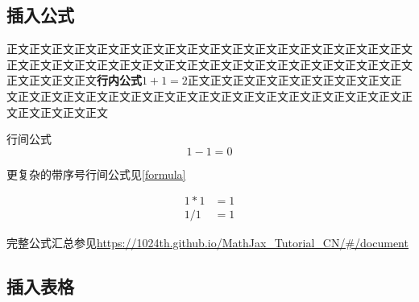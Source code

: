 \documentclass[a4paper]{article}
\begin{document}
\subsection{插入公式}
正文正文正文正文正文正文正文正文正文正文正文正文正文正文正文正文正文正文正文正文正文正文正文正文正文正文正文正文正文正文正文正文正文正文正文正文正文正文正文正文\textbf{行内公式}$1+1=2$正文正文正文正文正文正文正文正文正文正文正文正文正文正文正文正文正文正文正文正文正文正文正文正文正文正文正文正文正文正文正文正文

行间公式
$$
1-1=0
$$

更复杂的带序号行间公式见\ref{formula}

\begin{equation}
\begin{aligned}
1*1&=1\\
1/1&=1
\end{aligned}
\label{formula}
\end{equation}

完整公式汇总参见\url{https://1024th.github.io/MathJax_Tutorial_CN/#/document}

\newpage
\subsection{插入表格}
\end{document}
